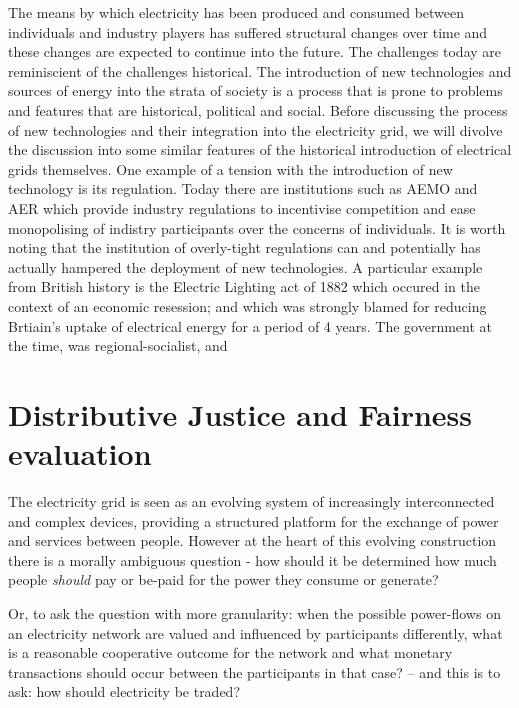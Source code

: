 \documentclass{article}
\begin{document}
The means by which electricity has been produced and consumed between individuals and industry players has suffered structural changes over time and these changes are expected to continue into the future.
The challenges today are reminiscient of the challenges historical.
The introduction of new technologies and sources of energy into the strata of society is a process that is prone to problems and features that are historical, political and social.
Before discussing the process of new technologies and their integration into the electricity grid, we will divolve the discussion into some similar features of the historical introduction of electrical grids themselves.
One example of a tension with the introduction of new technology is its regulation.
Today there are institutions such as AEMO and AER which provide industry regulations to incentivise competition and ease monopolising of indistry participants over the concerns of individuals.
It is worth noting that the institution of overly-tight regulations can and potentially has actually hampered the deployment of new technologies.
A particular example from British history is the Electric Lighting act of 1882 which occured in the context of an economic resession; and which was strongly blamed for reducing Brtiain's uptake of electrical energy for a period of 4 years.
The government at the time, was regional-socialist, and



\section{Distributive Justice and Fairness evaluation}


The electricity grid is seen as an evolving system of increasingly interconnected and complex devices, providing a structured platform for the exchange of power and services between people.
However at the heart of this evolving construction there is a morally ambiguous question - how should it be determined how much people \textit{should} pay or be-paid for the power they consume or generate?

Or, to ask the question with more granularity: when the possible power-flows on an electricity network are valued and influenced by participants differently, 
what is a reasonable cooperative outcome for the network and what monetary transactions should occur between the participants in that case? -- and this is to ask: how should electricity be traded?\\
\end{document}
